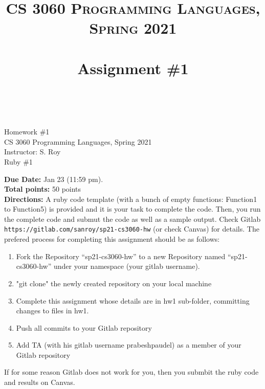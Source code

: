 \documentclass[paper=letter, fontsize=11pt]{scrartcl} %
\title{ 
    \normalfont \normalsize 
    \textsc{CS 3060 Programming Languages, Spring 2021} \\ [25pt] %
    \horrule{0.5pt} \\[0.4cm] %
    \huge Assignment \#1  \\ %
    \horrule{2pt} \\[0.5cm] %
}
\begin{document}
    \begin{center}
         Homework \#1\\
        \small CS 3060 Programming Languages, Spring 2021 \\
        \small Instructor: S. Roy \\
        \huge Ruby \#1
    \end{center}
    
    \textbf{Due Date:}  Jan 23 (11:59 pm).\\

    \textbf{Total points:} 50 points \\

    \textbf{Directions:} A ruby code template (with a bunch of empty functions: Function1 to Function5) is provided and it is your task to complete the code. 
Then, you run the complete code and submut the code as well as a sample output. 
Check Gitlab \@ \texttt{https://gitlab.com/sanroy/sp21-cs3060-hw} (or check Canvas) for details. 
The prefered process for completing this assignment should be as follows:

    \begin{enumerate}[noitemsep]
        \item Fork the Repository ``sp21-cs3060-hw'' to a new Repository named ``sp21-cs3060-hw'' under your namespace (your gitlab username).
        \item "git clone" the newly created repository on your local machine
        \item Complete this assignment whose details are in hw1 sub-folder, committing changes to files in hw1. 
        \item Push all commits to your Gitlab repository
        \item Add TA (with his gitlab username prabeshpaudel) as a member of your Gitlab repository
    \end{enumerate}

If for some reason Gitlab does not work for you, then you submbit the ruby code and results on Canvas.
\end{document}

